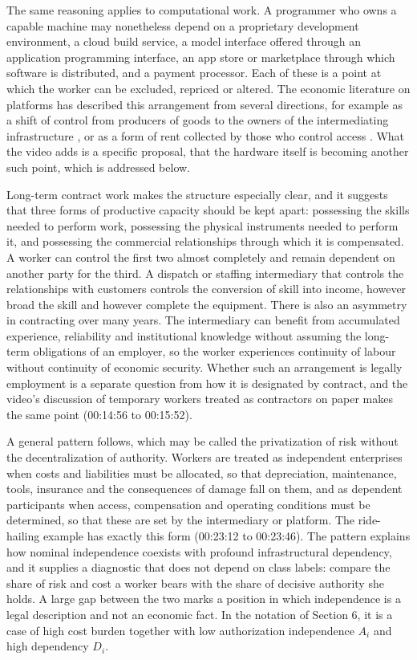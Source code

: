 \documentclass[11pt]{article}
\theoremstyle{plain}
\theoremstyle{definition}
\begin{document}
The same reasoning applies to computational work. A programmer who owns a capable machine may nonetheless depend on a proprietary development environment, a cloud build service, a model interface offered through an application programming interface, an app store or marketplace through which software is distributed, and a payment processor. Each of these is a point at which the worker can be excluded, repriced or altered. The economic literature on platforms has described this arrangement from several directions, for example as a shift of control from producers of goods to the owners of the intermediating infrastructure \cite{srnicek}, or as a form of rent collected by those who control access \cite{varoufakis}. What the video adds is a specific proposal, that the hardware itself is becoming another such point, which is addressed below.

Long-term contract work makes the structure especially clear, and it suggests that three forms of productive capacity should be kept apart: possessing the skills needed to perform work, possessing the physical instruments needed to perform it, and possessing the commercial relationships through which it is compensated. A worker can control the first two almost completely and remain dependent on another party for the third. A dispatch or staffing intermediary that controls the relationships with customers controls the conversion of skill into income, however broad the skill and however complete the equipment. There is also an asymmetry in contracting over many years. The intermediary can benefit from accumulated experience, reliability and institutional knowledge without assuming the long-term obligations of an employer, so the worker experiences continuity of labour without continuity of economic security. Whether such an arrangement is legally employment is a separate question from how it is designated by contract, and the video's discussion of temporary workers treated as contractors on paper makes the same point (00:14:56 to 00:15:52).

A general pattern follows, which may be called the privatization of risk without the decentralization of authority. Workers are treated as independent enterprises when costs and liabilities must be allocated, so that depreciation, maintenance, tools, insurance and the consequences of damage fall on them, and as dependent participants when access, compensation and operating conditions must be determined, so that these are set by the intermediary or platform. The ride-hailing example has exactly this form (00:23:12 to 00:23:46). The pattern explains how nominal independence coexists with profound infrastructural dependency, and it supplies a diagnostic that does not depend on class labels: compare the share of risk and cost a worker bears with the share of decisive authority she holds. A large gap between the two marks a position in which independence is a legal description and not an economic fact. In the notation of Section 6, it is a case of high cost burden together with low authorization independence $A_i$ and high dependency $D_i$.
\end{document}
